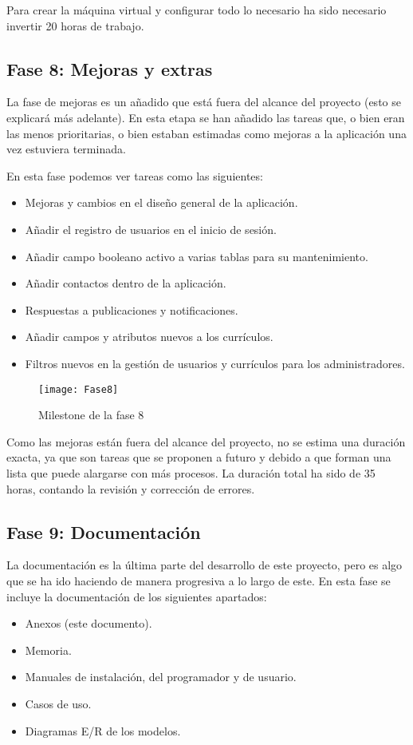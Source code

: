 Para crear la máquina virtual y configurar todo lo necesario ha sido necesario invertir 20 horas de trabajo.


\subsection{Fase 8: Mejoras y extras}
La fase de mejoras es un añadido que está fuera del alcance del proyecto (esto se explicará
más adelante). En esta etapa se han añadido las tareas que, o bien eran las menos prioritarias,
o bien estaban estimadas como mejoras a la aplicación una vez estuviera terminada.

En esta fase podemos ver tareas como las siguientes:
\begin{itemize}
\tightlist
\item Mejoras y cambios en el diseño general de la aplicación.
\item Añadir el registro de usuarios en el inicio de sesión.
\item Añadir campo booleano activo a varias tablas para su mantenimiento.
\item Añadir contactos dentro de la aplicación.
\item Respuestas a publicaciones y notificaciones.
\item Añadir campos y atributos nuevos a los currículos.
\item Filtros nuevos en la gestión de usuarios y currículos para los administradores.
\end{itemize}

\begin{figure}
    \centering
    \texttt{[image: Fase8]}
    \caption{Milestone de la fase 8}
\end{figure}

Como las mejoras están fuera del alcance del proyecto, no se estima una duración exacta,
ya que son tareas que se proponen a futuro y debido a que forman una lista que puede
alargarse con más procesos. La duración total ha sido de 35 horas, contando la revisión y corrección de errores.

\subsection{Fase 9: Documentación}
La documentación es la última parte del desarrollo de este proyecto, pero es algo que se ha ido haciendo de manera progresiva a lo largo de este. En esta fase se incluye la documentación de los siguientes apartados:
\begin{itemize}
\tightlist
\item Anexos (este documento).
\item Memoria.
\item Manuales de instalación, del programador y de usuario.
\item Casos de uso.
\item Diagramas E/R de los modelos.
\end{itemize}

